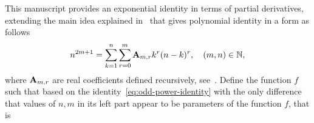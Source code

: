 This manuscript provides an exponential identity in terms of partial derivatives,
extending the main idea explained in~\cite{kolosov_2022} that gives polynomial identity in a form as follows
\begin{equation}
    n^{2m+1} = \sum_{k=1}^{n} \sum_{r=0}^{m} {\mathbf{A}} \sb{m,r} k^r (n-k)^r, \quad (m,n) \in \mathbb{N},
    \label{eq:odd-power-identity}
\end{equation}
where ${\mathbf{A}} \sb{m,r}$ are real coefficients defined recursively, see~\cite{kolosov2016link}.
Define the function $f$ such that based on the identity~\eqref{eq:odd-power-identity} with the only difference that
values of $n, m$ in its left part appear to be parameters of the function $f$, that is
